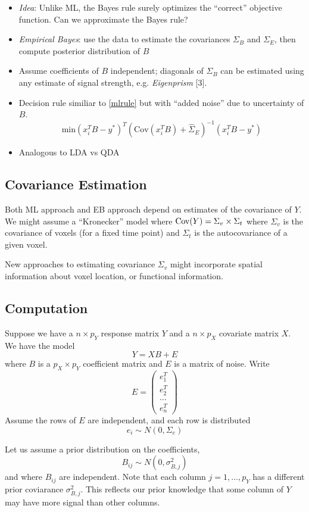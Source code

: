 \documentclass[12pt]{article}
\begin{document}
\begin{itemize}
\item \emph{Idea}: Unlike ML, the Bayes rule surely optimizes the ``correct'' objective function.  Can we approximate the Bayes rule?
\item \emph{Empirical Bayes}: use the data to estimate the covariances
$\Sigma_B$ and $\Sigma_E$, then compute posterior distribution of $B$
\item Assume coefficients of $B$ independent; diagonals of $\Sigma_B$ can be estimated using any estimate of signal strength, e.g. \emph{Eigenprism} [3].
\item Decision rule similiar to \eqref{mlrule} but with ``added noise'' due to uncertainty of $B$.
\[
\text{min} (x_i^T B - y^*)^T (\text{Cov}(x_i^T B) + \hat{\Sigma}_E)^{-1} (x_i^T B - y^*)
\]
\item Analogous to LDA vs QDA
\end{itemize}

\subsection{Covariance Estimation}

Both ML approach and EB approach depend on estimates of the covariance of $Y$.
We might assume a ``Kronecker'' model where $\text{Cov}(Y) = \Sigma_v \times \Sigma_t$
where $\Sigma_v$ is the covariance of voxels (for a fixed time point)
and $\Sigma_t$ is the autocovariance of a given voxel.

New approaches to estimating covariance $\Sigma_v$ might incorporate
spatial information about voxel location, or functional information.

\subsection{Computation}

Suppose we have a $n \times p_Y$ response matrix $Y$ and a $n \times p_X$ covariate matrix $X$.
We have the model
$$
Y = XB + E
$$
where $B$ is a $p_X \times p_Y$ coefficient matrix and $E$ is a matrix of noise.
Write $$
E = \begin{pmatrix} e_1^T\\e_2^T\\ ... \\ e_n^T \end{pmatrix}
$$
Assume the rows of $E$ are independent, and each row is distributed
$$
e_i \sim N(0, \Sigma_e)
$$

Let us assume a prior distribution on the coefficients,
$$
B_{ij} \sim N(0, \sigma^2_{B, j})
$$
and where $B_{ij}$ are independent.
Note that each column $j = 1,...,p_Y$ has a different prior coviarance $\sigma^2_{B, j}$.
This reflects our prior knowledge that some column of $Y$ may have more signal than other columns.
\end{document}
